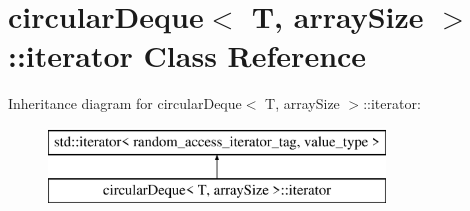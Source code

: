 \hypertarget{classcircularDeque_1_1iterator}{\section{circular\+Deque$<$ T, array\+Size $>$\+:\+:iterator Class Reference}
\label{classcircularDeque_1_1iterator}
}
Inheritance diagram for circular\+Deque$<$ T, array\+Size $>$\+:\+:iterator\+:\begin{figure}[H]
\begin{center}
\leavevmode
\includegraphics[height=2.000000cm]{classcircularDeque_1_1iterator}
\end{center}
\end{figure}
